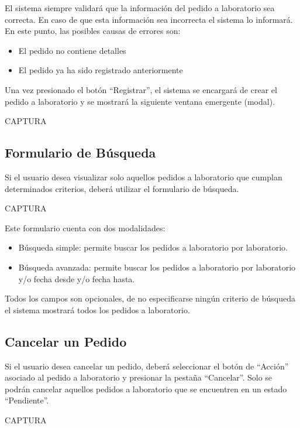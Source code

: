 \documentclass[letterpaper,10pt,spanish]{sphinxmanual}
\begin{document}
El sistema siempre validará que la información del pedido a laboratorio sea correcta. En caso de que esta información sea incorrecta el sistema lo informará.
En este punto, las posibles causas de errores son:
\begin{itemize}
\item {} 
El pedido no contiene detalles

\item {} 
El pedido ya ha sido registrado anteriormente

\end{itemize}

Una vez presionado el botón “Registrar”, el sistema se encargará de crear el pedido a laboratorio  y se mostrará la siguiente ventana emergente (modal).

CAPTURA


\subsection{Formulario de Búsqueda}
\label{pedidosalab:formulario-de-busqueda}
Si el usuario desea visualizar solo aquellos pedidos a laboratorio que cumplan determinados criterios, deberá utilizar el formulario de búsqueda.

CAPTURA

Este formulario cuenta con dos modalidades:
\begin{itemize}
\item {} 
Búsqueda simple: permite buscar los pedidos a laboratorio por laboratorio.

\item {} 
Búsqueda avanzada: permite buscar los pedidos a laboratorio por laboratorio y/o fecha desde y/o fecha hasta.

\end{itemize}

Todos los campos son opcionales, de no especificarse ningún criterio de búsqueda el sistema mostrará todos los pedidos a laboratorio.


\subsection{Cancelar un Pedido}
\label{pedidosalab:cancelar-un-pedido}
Si el usuario desea cancelar un pedido, deberá seleccionar el botón de “Acción” asociado al pedido a laboratorio y presionar la pestaña “Cancelar”. Solo se podrán cancelar aquellos pedidos a laboratorio que se encuentren en un estado “Pendiente”.

CAPTURA
\end{document}
